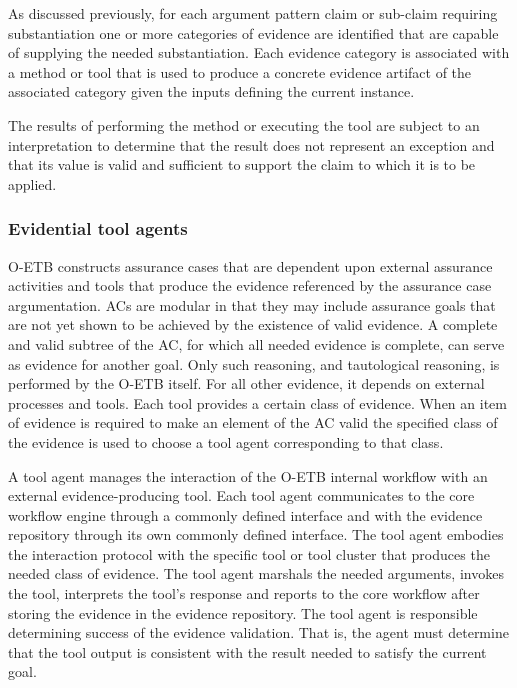 \documentclass[12pt,twoside,a4paper]{article}
\begin{document}
As discussed previously, for each argument pattern claim or sub-claim requiring substantiation one or more categories of evidence are identified that are capable of supplying the needed substantiation. Each evidence category is associated with a method or tool that is used to produce a concrete evidence artifact of the associated category given the inputs defining the current instance.

The results of performing the method or executing the tool are subject to an interpretation to determine that the result does not represent an exception and that its value is valid and sufficient to support the claim to which it is to be applied.

\hypertarget{evidential-tool-agents}{%
\subsubsection{Evidential tool agents}\label{evidential-tool-agents}}

O-ETB constructs assurance cases that are dependent upon external assurance activities and tools that produce the evidence referenced by the assurance case argumentation. ACs are modular in that they may include assurance goals that are not yet shown to be achieved by the existence of valid evidence. A complete and valid subtree of the AC, for which all needed evidence is complete, can serve as evidence for another goal. Only such reasoning, and tautological reasoning, is performed by the O-ETB itself. For all other evidence, it depends on external processes and tools. Each tool provides a certain class of evidence. When an item of evidence is required to make an element of the AC valid the specified class of the evidence is used to choose a tool agent corresponding to that class.

A tool agent manages the interaction of the O-ETB internal workflow with an external evidence-producing tool. Each tool agent communicates to the core workflow engine through a commonly defined interface and with the evidence repository through its own commonly defined interface. The tool agent embodies the interaction protocol with the specific tool or tool cluster that produces the needed class of evidence. The tool agent marshals the needed arguments, invokes the tool, interprets the tool's response and reports to the core workflow after storing the evidence in the evidence repository. The tool agent is responsible determining success of the evidence validation. That is, the agent must determine that the tool output is consistent with the result needed to satisfy the current goal.
\end{document}
